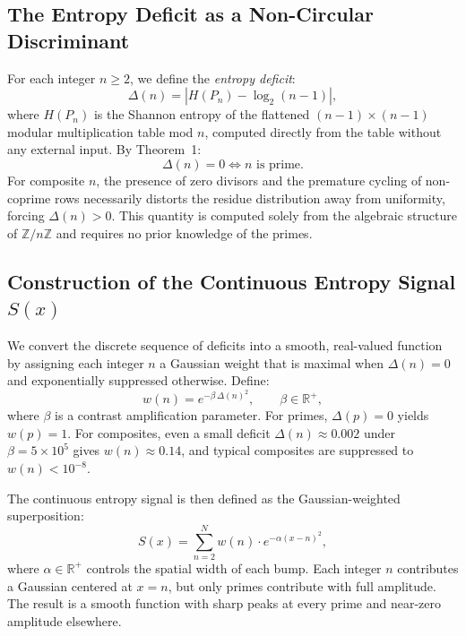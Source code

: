 \documentclass[11pt,twoside]{article}
\begin{document}
	\subsection{The Entropy Deficit as a Non-Circular Discriminant}
	For each integer $n \geq 2$, we define the \emph{entropy deficit}:
	\begin{equation}
		\Delta(n) = \left| H(P_n) - \log_2(n-1) \right|,
	\end{equation}
	where $H(P_n)$ is the Shannon entropy of the flattened $(n-1) \times (n-1)$ modular multiplication table mod $n$, computed directly from the table without any external input. By Theorem~1:
	\begin{equation}
		\Delta(n) = 0 \iff n \text{ is prime}.
	\end{equation}
	For composite $n$, the presence of zero divisors and the premature cycling of non-coprime rows necessarily distorts the residue distribution away from uniformity, forcing $\Delta(n) > 0$. This quantity is computed solely from the algebraic structure of $\mathbb{Z}/n\mathbb{Z}$ and requires no prior knowledge of the primes.
	
	\subsection{Construction of the Continuous Entropy Signal $S(x)$}
	We convert the discrete sequence of deficits into a smooth, real-valued function by assigning each integer $n$ a Gaussian weight that is maximal when $\Delta(n) = 0$ and exponentially suppressed otherwise. Define:
	\begin{equation}
		w(n) = e^{-\beta \, \Delta(n)^2}, \qquad \beta \in \mathbb{R}^+,
	\end{equation}
	where $\beta$ is a contrast amplification parameter. For primes, $\Delta(p) = 0$ yields $w(p) = 1$. For composites, even a small deficit $\Delta(n) \approx 0.002$ under $\beta = 5 \times 10^5$ gives $w(n) \approx 0.14$, and typical composites are suppressed to $w(n) < 10^{-8}$.
	
	The continuous entropy signal is then defined as the Gaussian-weighted superposition:
	\begin{equation}
		S(x) = \sum_{n=2}^{N} w(n) \cdot e^{-\alpha (x - n)^2},
	\end{equation}
	where $\alpha \in \mathbb{R}^+$ controls the spatial width of each bump. Each integer $n$ contributes a Gaussian centered at $x = n$, but only primes contribute with full amplitude. The result is a smooth function with sharp peaks at every prime and near-zero amplitude elsewhere.
	
\end{document}
